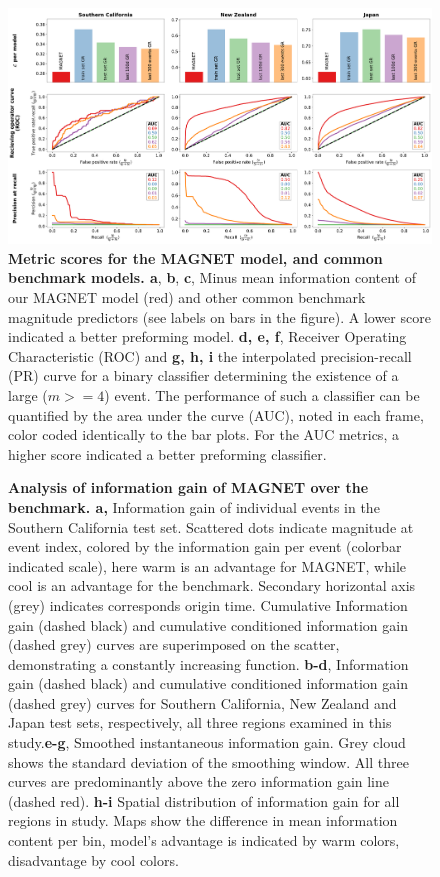 \documentclass[pdflatex]{sn-jnl}
\begin{document}
\begin{figure}[h!]
    \centering
    \includegraphics[width=1\textwidth]{figures/combined_barplots.pdf}
    \caption{
        \textbf{Metric scores for the MAGNET model, and common benchmark models. a}, \textbf{b}, \textbf{c}, Minus mean information content of our MAGNET model (red) and other common benchmark magnitude predictors (see labels on bars in the figure). A lower score indicated a better preforming model. \textbf{d, e, f}, Receiver Operating Characteristic (ROC) and \textbf{g, h, i} the interpolated precision-recall (PR) curve for a binary classifier determining the existence of a large ($m>=4$) event. The performance of such a classifier can be quantified by the area under the curve (AUC), noted in each frame, color coded identically to the bar plots. For the AUC metrics, a higher score indicated a better preforming classifier.
        }
        \label{fig:metrics}
\end{figure}

   
    
\begin{figure}[h!]
    \centering
    \caption{
        \textbf{Analysis of information gain of MAGNET over the benchmark. a,} Information gain of individual events in the Southern California test set. Scattered dots indicate magnitude at event index, colored by the information gain per event (colorbar indicated scale), here warm is an advantage for MAGNET, while cool is an advantage for the benchmark. Secondary horizontal axis (grey) indicates corresponds origin time. Cumulative Information gain (dashed black) and cumulative conditioned information gain (dashed grey) curves are superimposed on the scatter, demonstrating a constantly increasing function. \textbf{b-d}, Information gain (dashed black) and cumulative conditioned information gain (dashed grey) curves for Southern California, New Zealand and Japan test sets, respectively, all three regions examined in this study.\textbf{e-g}, Smoothed instantaneous information gain. Grey cloud shows the standard deviation of the smoothing window. All three curves are predominantly above the zero information gain line (dashed red). \textbf{h-i} Spatial distribution of information gain for all regions in study. Maps show the difference in mean information content per bin, model's advantage is indicated by warm colors, disadvantage by cool colors.
    }
    \label{fig:info_gain_over_time}
\end{figure}
    
\end{document}
